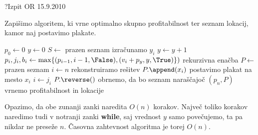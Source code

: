 \begin{naloga}{?}{Izpit OR 15.9.2010}
\begin{odgovor}
\begin{enumerate}[(a)]
Zapišimo algoritem, ki vrne optimalno skupno profitabilnost
ter seznam lokacij, kamor naj postavimo plakate.
\begin{small}
\begin{algorithmic}
    \State $p_0 \gets 0$
    \State $y \gets 0$
    \State $S \gets$ prazen seznam
         \hfill izračunamo $y_i$
            \State $y \gets y+1$
        \EndWhile
        \State $p_i, j_i, b_i \gets \max\{(p_{i-1}, i-1, \False),
                                          (v_i + p_y, y, \True)\})$
            \hfill rekurzivna enačba
    \EndFor
    \State $P \gets$ prazen seznam
    \State $i \gets n$
     \hfill rekonstruiramo rešitev
            \State $P.\append(x_i)$ \hfill postavimo plakat na mesto $x_i$
        \EndIf
        \State $i \gets j_i$
    \EndWhile
    \State $P.\reverse()$ \hfill obrnemo, da bo seznam naraščajoč
    \State \Return $(p_n, P)$ \hfill vrnemo profitabilnost in lokacije
\EndFunction
\end{algorithmic}
\end{small}
Opazimo, da obe zunanji zanki naredita $O(n)$ korakov.
Največ toliko korakov naredimo tudi v notranji zanki {\bf while},
saj vrednost $y$ samo povečujemo, ta pa nikdar ne preseže $n$.
Časovna zahtevnost algoritma je torej $O(n)$.
\end{enumerate}
\end{odgovor}
\end{naloga}

